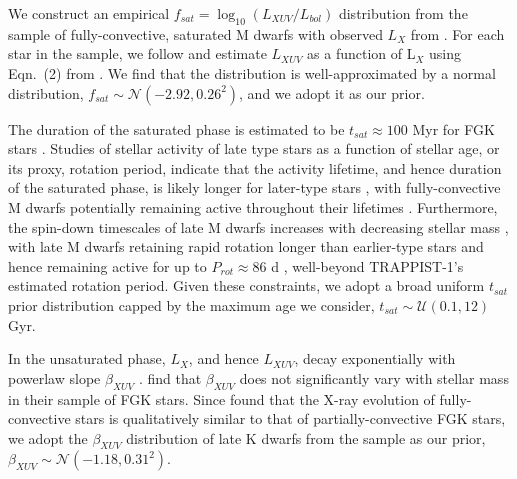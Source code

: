 \documentclass[twocolumn]{aastex62}
\def\gsim{~\rlap{$>$}{\lower 1.0ex\hbox{$\sim$}}}
\begin{document}
We construct an empirical $f_{sat} = \log_{10}(L_{XUV}/L_{bol})$ distribution from the sample of fully-convective, saturated M dwarfs with observed $L_{X}$ from \citet{Wright2011}. For each star in the \citet{Wright2011} sample, we follow \citet{Wheatley2017} and estimate $L_{XUV}$ as a function of L$_{X}$ using Eqn.~(2) from \citet{Chadney2015}. We find that the distribution is well-approximated by a normal distribution, $f_{sat} \sim \mathcal{N}(-2.92, 0.26^2)$, and we adopt it as our prior.  

The duration of the saturated phase is estimated to be $t_{sat} \approx 100$ Myr for FGK stars \citep{Jackson2012}. Studies of stellar activity of late type stars as a function of stellar age, or its proxy, rotation period, indicate that the activity lifetime, and hence duration of the saturated phase, is likely longer for later-type stars \citep{Shkolnik2014,Wright2011,West2015}, with fully-convective M dwarfs potentially remaining active throughout their lifetimes \citep[$t_{sat} \gsim 7$ Gyr,][]{West2008,Schneider2018}. Furthermore, the spin-down timescales of late M dwarfs increases with decreasing stellar mass \citep{Delfosse1998}, with late M dwarfs retaining rapid rotation longer than earlier-type stars and hence remaining active for up to $P_{rot} \approx 86$ d \citep{West2015}, well-beyond TRAPPIST-1's estimated rotation period. Given these constraints, we adopt a broad uniform $t_{sat}$ prior distribution capped by the maximum age we consider, $t_{sat} \sim \mathcal{U}(0.1, 12)$ Gyr. 

In the unsaturated phase, $L_{X}$, and hence $L_{XUV}$, decay exponentially with powerlaw slope $\beta_{XUV}$ \citep{Ribas2005}. \citet{Jackson2012} find that $\beta_{XUV}$ does not significantly vary with stellar mass in their sample of FGK stars. Since \citet{Wright2016} found that the X-ray evolution of fully-convective stars is qualitatively similar to that of partially-convective FGK stars, we adopt the $\beta_{XUV}$ distribution of late K dwarfs from the \citet{Jackson2012} sample as our prior, $\beta_{XUV} \sim \mathcal{N}(-1.18, 0.31^2)$.

\end{document}
